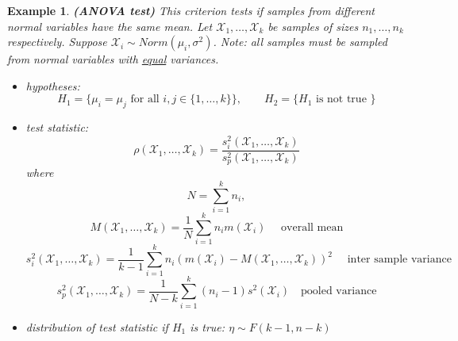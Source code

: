 \documentclass[12pt]{article}
\newtheorem{example}[theorem]{Example}
\begin{document}
\begin{example} \textbf{(ANOVA test)} This criterion tests if samples from different normal variables have the same mean. Let $\mathscr{X}_1,\ldots,\mathscr{X}_k$ be samples of sizes $n_1,\ldots,n_k$ respectively. Suppose $\mathscr{X}_i\sim Norm(\mu_i,\sigma^2)$. Note: all samples must be sampled from normal variables with \underline{equal} variances. 
\begin{itemize}
    \item hypotheses: 
    $$H_1=\{\mu_i=\mu_j\mbox{ for all }i,j\in\{1,\ldots,k\}\},\quad\quad H_2=\{H_1\mbox{ is not true }\}$$
    \item test statistic: 
    $$
    \rho(\mathscr{X}_1,\ldots,\mathscr{X}_k)=\frac{s_i^2(\mathscr{X}_1,\ldots,\mathscr{X}_k)}{s_p^2(\mathscr{X}_1,\ldots,\mathscr{X}_k)}
    $$
    where
    $$
    N=\sum_{i=1}^k n_i,
    $$
    $$
    M(\mathscr{X}_1,\ldots,\mathscr{X}_k)=\frac{1}{N}\sum_{i=1}^k n_i m(\mathscr{X}_i)\quad\mbox{ overall mean}
    $$
    $$
    s_i^2(\mathscr{X}_1,\ldots,\mathscr{X}_k)=\frac{1}{k-1}\sum_{i=1}^k n_i(m(\mathscr{X}_i)-M(\mathscr{X}_1,\ldots,\mathscr{X}_k))^2\quad \mbox{ inter sample variance}
    $$
    $$
    s_p^2(\mathscr{X}_1,\ldots,\mathscr{X}_k)=\frac{1}{N-k}\sum_{i=1}^k (n_i-1) s^2(\mathscr{X}_i)
    \quad \mbox{pooled variance}
    $$
    \item distribution of test statistic if $H_1$ is true: $\eta\sim F(k-1, n-k)$
\end{itemize}
\end{example}
\end{document}
